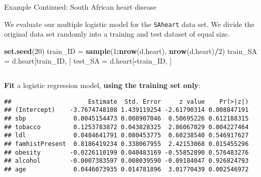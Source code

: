 \documentclass[10pt,ignorenonframetext,]{beamer}
\newenvironment{Shaded}{\begin{snugshade}}{\end{snugshade}}
\newcommand{\DataTypeTok}[1]{\textcolor[rgb]{0.13,0.29,0.53}{#1}}
\newcommand{\DecValTok}[1]{\textcolor[rgb]{0.00,0.00,0.81}{#1}}
\newcommand{\KeywordTok}[1]{\textcolor[rgb]{0.13,0.29,0.53}{\textbf{#1}}}
\newcommand{\NormalTok}[1]{#1}
\newcommand{\OperatorTok}[1]{\textcolor[rgb]{0.81,0.36,0.00}{\textbf{#1}}}
\newcommand{\StringTok}[1]{\textcolor[rgb]{0.31,0.60,0.02}{#1}}
\begin{document}
\begin{frame}[fragile]

\begin{block}{Example Continued: South African heart disease}

\vspace{2mm}

We evaluate our multiple logistic model for the \texttt{SAheart} data
set. We divide the original data set randomly into a training and test
dataset of equal size.

\vspace{2mm}

\scriptsize

\begin{Shaded}
\begin{Highlighting}[]
\KeywordTok{set.seed}\NormalTok{(}\DecValTok{20}\NormalTok{)}
\NormalTok{train_ID =}\StringTok{ }\KeywordTok{sample}\NormalTok{(}\DecValTok{1}\OperatorTok{:}\KeywordTok{nrow}\NormalTok{(d.heart), }\KeywordTok{nrow}\NormalTok{(d.heart)}\OperatorTok{/}\DecValTok{2}\NormalTok{)}
\NormalTok{train_SA =}\StringTok{ }\NormalTok{d.heart[train_ID, ]}
\NormalTok{test_SA =}\StringTok{ }\NormalTok{d.heart[}\OperatorTok{-}\NormalTok{train_ID, ]}
\end{Highlighting}
\end{Shaded}

\normalsize

\(~\)

\textbf{Fit} a logistic regression model, \textbf{using the training set
only}:

\vspace{2mm}

\scriptsize

\begin{Shaded}
\end{Shaded}

\begin{verbatim}
##                     Estimate  Std. Error     z value    Pr(>|z|)
## (Intercept)    -3.7674748108 1.439119254 -2.61790314 0.008847191
## sbp             0.0045154473 0.008907046  0.50695226 0.612188315
## tobacco         0.1253783872 0.043828325  2.86067029 0.004227464
## ldl             0.0484641791 0.080453775  0.60238540 0.546917627
## famhistPresent  0.8186419234 0.338067955  2.42153068 0.015455296
## obesity        -0.0226110199 0.040483169 -0.55852890 0.576483276
## alcohol        -0.0007383597 0.008039590 -0.09184047 0.926824793
## age             0.0446073935 0.014781896  3.01770439 0.002546972
\end{verbatim}

\end{block}

\end{frame}
\end{document}

